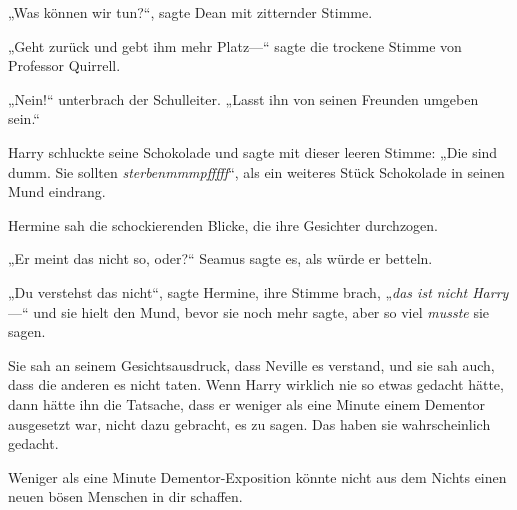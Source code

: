 „Was können wir tun?“, sagte Dean mit zitternder Stimme.

„Geht zurück und gebt ihm mehr Platz—“ sagte die trockene Stimme von Professor Quirrell.

„Nein!“ unterbrach der Schulleiter. „Lasst ihn von seinen Freunden umgeben sein.“

Harry schluckte seine Schokolade und sagte mit dieser leeren Stimme: „Die sind dumm. Sie sollten \emph{sterbenmmmpfffff}“, als ein weiteres Stück Schokolade in seinen Mund eindrang.

Hermine sah die schockierenden Blicke, die ihre Gesichter durchzogen.

„Er meint das nicht so, oder?“ Seamus sagte es, als würde er betteln.

„Du verstehst das nicht“, sagte Hermine, ihre Stimme brach, „\emph{das ist nicht Harry}—“ und sie hielt den Mund, bevor sie noch mehr sagte, aber so viel \emph{musste} sie sagen.

Sie sah an seinem Gesichtsausdruck, dass Neville es verstand, und sie sah auch, dass die anderen es nicht taten. Wenn Harry wirklich nie so etwas gedacht hätte, dann hätte ihn die Tatsache, dass er weniger als eine Minute einem Dementor ausgesetzt war, nicht dazu gebracht, es zu sagen. Das haben sie wahrscheinlich gedacht.

Weniger als eine Minute Dementor-Exposition könnte nicht aus dem Nichts einen neuen bösen Menschen in dir schaffen.

